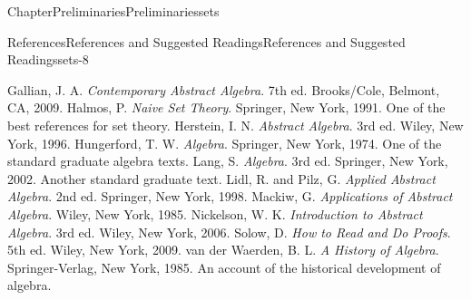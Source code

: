 \documentclass[oneside,10pt,]{book}
\numberwithin{equation}{section}
\begin{document}
\begin{chapterptx}{Chapter}{Preliminaries}{}{Preliminaries}{}{}{sets}
\begin{references-section}{References}{References and Suggested Readings}{}{References and Suggested Readings}{}{}{sets-8}
\begin{referencelist}
\hypertarget{sets-8-7}{}  Gallian, J. A. \textit{Contemporary Abstract Algebra}. 7th ed. Brooks\slash{}Cole, Belmont, CA, 2009.
\hypertarget{sets-8-8}{}  Halmos, P. \textit{Naive Set Theory}.  Springer, New York, 1991. One of the best references for set theory.
\hypertarget{sets-8-9}{}  Herstein, I. N. \textit{Abstract Algebra}. 3rd ed. Wiley, New York, 1996.
\hypertarget{sets-8-10}{}  Hungerford, T. W. \textit{Algebra}. Springer, New York, 1974. One of the standard graduate algebra texts.
\hypertarget{sets-8-11}{}  Lang, S. \textit{Algebra}. 3rd ed. Springer, New York, 2002. Another standard graduate text.
\hypertarget{sets-8-12}{}  Lidl, R. and Pilz, G. \textit{Applied Abstract Algebra}. 2nd ed. Springer, New York, 1998.
\hypertarget{sets-8-13}{}  Mackiw, G. \textit{Applications of Abstract Algebra}. Wiley, New York, 1985.
\hypertarget{sets-8-14}{} Nickelson, W. K.  \textit{Introduction to Abstract Algebra}. 3rd ed. Wiley, New York, 2006.
\hypertarget{sets-8-15}{}  Solow, D. \textit{How to Read and Do Proofs}. 5th ed. Wiley, New York, 2009.
\hypertarget{sets-8-16}{}  van der Waerden, B. L. \textit{A History of Algebra}. Springer-Verlag, New York, 1985. An account of the historical development of algebra.
\end{referencelist}
\end{references-section}
\end{chapterptx}
%
%
\typeout{************************************************}
\typeout{************************************************}
%
\end{document}
